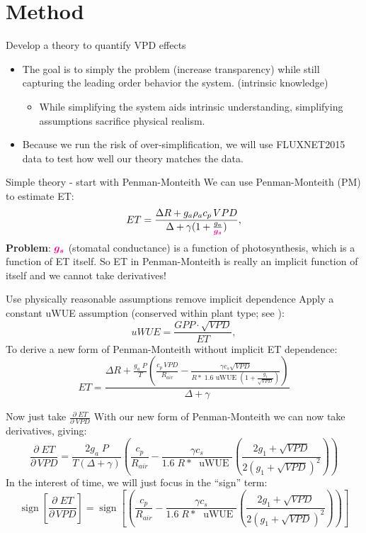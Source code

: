 \documentclass[aspectratio=169]{beamer}
\DeclareMathOperator{\sign}{sign}
\begin{document}
\section{Method}
\begin{frame}{Develop a theory to quantify VPD effects}
  \begin{itemize}
  \item The goal is to simply the problem (increase transparency) while still capturing the leading order behavior the system. (intrinsic knowledge)
    \begin{itemize}
    \item While simplifying the system aids intrinsic understanding, simplifying assumptions sacrifice physical realism.
    \end{itemize}
  \item Because we run the risk of over-simplification, we will use FLUXNET2015 data to test how well our theory matches the data. 
  \end{itemize}
\end{frame}

\begin{frame}{Simple theory - start with Penman-Monteith}
  We can use Penman-Monteith (PM) to estimate ET:
  \[ET = \frac{\Delta R + g_a \rho_a c_p \, VPD}{\Delta + \gamma(1 + \frac{g_a}{\textcolor{magenta}{\boldsymbol{g_s}}})},\]
\textbf{Problem}: \Large $\textcolor{magenta}{\boldsymbol{g_s}}$ \normalsize (stomatal conductance) is a function of photosynthesis, which is a function of ET itself.  So ET in Penman-Monteith is really an implicit function of itself and we cannot take derivatives!
\end{frame}

\begin{frame}{Use physically reasonable assumptions remove implicit dependence}
Apply a constant uWUE assumption (conserved within plant type; see \cite{Zhou_2016}):
\[uWUE = \frac{GPP \cdot \sqrt{VPD}}{ET},\]
To derive a new form of Penman-Monteith without implicit ET dependence:
  \[  ET = \frac{\Delta R + \frac{g_a\; P}{T} \left( \frac{ c_p \, VPD}{R_{air}} -  \frac{\gamma c_s \sqrt{VPD} }{ R* \; 1.6 \text{ uWUE } (1 + \frac{g_1}{\sqrt{VPD}})} \right)}{ \Delta + \gamma}\]
\end{frame}

\begin{frame}{Now just take $\frac{\partial \; ET}{\partial \; VPD}$}
  With our new form of Penman-Monteith we can now take derivatives, giving:
  \[\frac{\partial \;  ET}{\partial \, VPD} = \frac{2 g_a \; P}{T(\Delta + \gamma)}   \left(\frac{ c_p}{R_{air}} - \frac{\gamma c_s }{1.6 \; R*\; \text{ uWUE }} \left( \frac{2 g_1 + \sqrt{VPD}}{2 (g_1 + \sqrt{VPD})^2}\right) \right)\]
  In the interest of time, we will just focus in the ``sign'' term:
  \[\sign \left[\frac{\partial \;  ET}{\partial \, VPD}\right] = \sign \left[  \left(\frac{ c_p}{R_{air}} - \frac{\gamma c_s }{1.6 \; R*\; \text{ uWUE }} \left( \frac{2 g_1 + \sqrt{VPD}}{2 (g_1 + \sqrt{VPD})^2}\right) \right) \right] \]

\end{frame}
\end{document}
